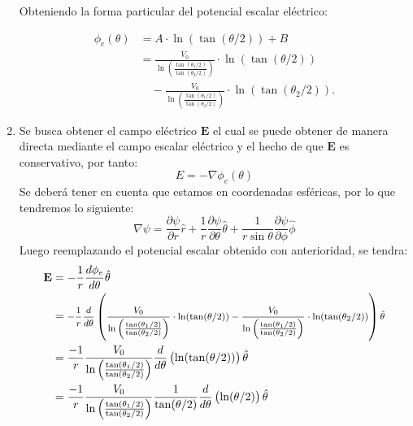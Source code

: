 \documentclass[
  11pt,
  letterpaper,
   addpoints,
   answers
  ]{exam}
\begin{document}
\begin{questions}
\begin{solution}
\begin{enumerate}
        Obteniendo la forma particular del potencial escalar eléctrico:
        
        \begin{equation}
            \begin{aligned}
                \phi_{e}(\theta) &= A\cdot \ln\left(\tan(\theta/2)\right) + B \\
                &= \frac{V_{0}}{\ln\left(\frac{\tan(\theta_{1}/2)}{\tan(\theta_{2}/2)}\right)} \cdot \ln\left(\tan(\theta/2)\right) \\
                &\quad - \frac{V_{0}}{\ln\left(\frac{\tan(\theta_{1}/2)}{\tan(\theta_{2}/2)}\right)} \cdot \ln\left(\tan(\theta_{2}/2)\right).
            \end{aligned}
        \end{equation}
    \item Se busca obtener el campo eléctrico $\textbf{E}$ el cual se puede obtener de manera directa mediante el campo escalar eléctrico y el hecho de que $\textbf{E}$ es conservativo, por tanto:
    \begin{equation}
        E= - \nabla \phi_{e}(\theta)
    \end{equation}
    Se deberá tener en cuenta que estamos en coordenadas esféricas, por lo que tendremos lo siguiente:
    \begin{equation}
        \nabla \psi = \frac{\partial \psi}{\partial r} \hat{r} + \frac{1}{r} \frac{\partial \psi}{\partial \theta} \hat{\theta} + \frac{1}{r \sin \theta} \frac{\partial \psi}{\partial \phi} \hat{\phi}
    \end{equation}
    Luego reemplazando el potencial escalar obtenido con anterioridad, se tendra:
    \begin{equation}
        \begin{aligned}
            \textbf{E} &= -\frac{1}{r}\frac{d\phi_{e}}{d\theta} \hat{\theta} \\
                       &= \text{\footnotesize$-\frac{1}{r} \frac{d}{d\theta}\left( \frac{V_{0}}{\ln\left(\frac{\tan(\theta_{1}/2)}{\tan(\theta_{2}/2)}\right)} \cdot \ln(\tan(\theta/2)) -\frac{V_{0}}{\ln\left(\frac{\tan(\theta_{1}/2)}{\tan(\theta_{2}/2)}\right)} \cdot \ln(\tan(\theta_{2}/2))\right) \hat{\theta}$} \\
                       &= \frac{-1}{r} \frac{V_{0}}{\ln\left(\frac{\tan(\theta_{1}/2)}{\tan(\theta_{2}/2)}\right)}  \frac{d}{d\theta} \left( \ln(\tan(\theta/2)) \right) \hat{\theta} \\
                       &=\frac{-1}{r} \frac{V_{0}}{\ln\left(\frac{\tan(\theta_{1}/2)}{\tan(\theta_{2}/2)}\right)} \frac{1}{\tan(\theta/2)} \frac{d}{d\theta}\left(\ln(\theta/2)\right)\hat{\theta} \\

\end{aligned}
\end{equation}
\end{enumerate}
\end{solution}
\end{questions}
\end{document}
